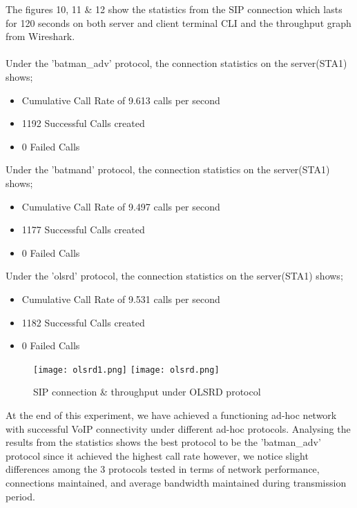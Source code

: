 \documentclass{article}
\begin{document}
\par The figures 10, 11 \& 12 show the statistics from the SIP connection which lasts for 120 seconds on both server and client terminal CLI and the throughput graph from Wireshark. \\\\ Under the 'batman\_adv' protocol, the connection statistics on the server(STA1) shows;
	\begin{itemize}
		\item Cumulative Call Rate of 9.613 calls per second
		\item 1192 Successful Calls created
		\item 0 Failed Calls
	\end{itemize}
Under the 'batmand' protocol, the connection statistics on the server(STA1) shows;
	\begin{itemize}
		\item Cumulative Call Rate of 9.497 calls per second
		\item 1177 Successful Calls created
		\item 0 Failed Calls
	\end{itemize}
Under the 'olsrd' protocol, the connection statistics on the server(STA1) shows;
	\begin{itemize}
		\item Cumulative Call Rate of 9.531 calls per second
		\item 1182 Successful Calls created
		\item 0 Failed Calls
	\end{itemize}
\newpage
    	\begin{figure}[]
        		\centering
        		\texttt{[image: olsrd1.png]}
        		\texttt{[image: olsrd.png]}
        		\caption{SIP connection \& throughput under OLSRD protocol}
        		\label{fig:t2-4}
    	\end{figure}
\par At the end of this experiment, we have achieved a functioning ad-hoc network with successful VoIP connectivity under different ad-hoc protocols. Analysing the results from the statistics shows the best protocol to be the 'batman\_adv' protocol since it achieved the highest call rate however, we notice slight differences among the 3 protocols tested in terms of network performance, connections maintained, and average bandwidth maintained during transmission period.

\newpage
\end{document}
